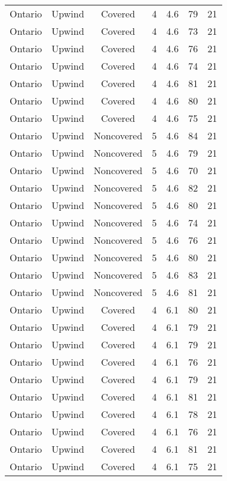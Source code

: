 \documentclass{article}
\begin{document}
\begin{longtable}[H]{ccccccc}
Ontario & Upwind   & Covered     & 4 & 4.6  & 79  & 21 \\
Ontario & Upwind   & Covered     & 4 & 4.6  & 73  & 21 \\
Ontario & Upwind   & Covered     & 4 & 4.6  & 76  & 21 \\
Ontario & Upwind   & Covered     & 4 & 4.6  & 74  & 21 \\
Ontario & Upwind   & Covered     & 4 & 4.6  & 81  & 21 \\
Ontario & Upwind   & Covered     & 4 & 4.6  & 80  & 21 \\
Ontario & Upwind   & Covered     & 4 & 4.6  & 75  & 21 \\
Ontario & Upwind   & Noncovered & 5 & 4.6  & 84  & 21 \\
Ontario & Upwind   & Noncovered & 5 & 4.6  & 79  & 21 \\
Ontario & Upwind   & Noncovered & 5 & 4.6  & 70  & 21 \\
Ontario & Upwind   & Noncovered & 5 & 4.6  & 82  & 21 \\
Ontario & Upwind   & Noncovered & 5 & 4.6  & 80  & 21 \\
Ontario & Upwind   & Noncovered & 5 & 4.6  & 74  & 21 \\
Ontario & Upwind   & Noncovered & 5 & 4.6  & 76  & 21 \\
Ontario & Upwind   & Noncovered & 5 & 4.6  & 80  & 21 \\
Ontario & Upwind   & Noncovered & 5 & 4.6  & 83  & 21 \\
Ontario & Upwind   & Noncovered & 5 & 4.6  & 81  & 21 \\
Ontario & Upwind   & Covered     & 4 & 6.1  & 80  & 21 \\
Ontario & Upwind   & Covered     & 4 & 6.1  & 79  & 21 \\
Ontario & Upwind   & Covered     & 4 & 6.1  & 79  & 21 \\
Ontario & Upwind   & Covered     & 4 & 6.1  & 76  & 21 \\
Ontario & Upwind   & Covered     & 4 & 6.1  & 79  & 21 \\
Ontario & Upwind   & Covered     & 4 & 6.1  & 81  & 21 \\
Ontario & Upwind   & Covered     & 4 & 6.1  & 78  & 21 \\
Ontario & Upwind   & Covered     & 4 & 6.1  & 76  & 21 \\
Ontario & Upwind   & Covered     & 4 & 6.1  & 81  & 21 \\
Ontario & Upwind   & Covered     & 4 & 6.1  & 75  & 21 \\

\end{longtable}
\end{document}
